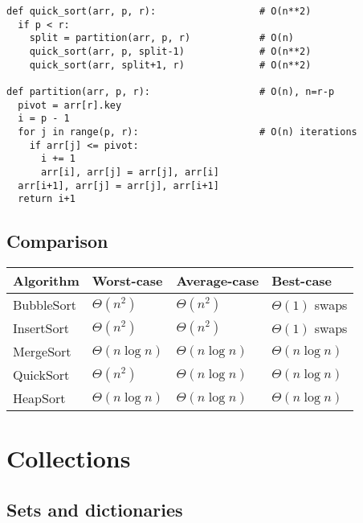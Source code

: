 \documentclass{article}
\begin{document}
\begin{verbatim}
def quick_sort(arr, p, r):                  # O(n**2)
  if p < r:
    split = partition(arr, p, r)            # O(n)
    quick_sort(arr, p, split-1)             # O(n**2)
    quick_sort(arr, split+1, r)             # O(n**2)

def partition(arr, p, r):                   # O(n), n=r-p
  pivot = arr[r].key
  i = p - 1
  for j in range(p, r):                     # O(n) iterations
    if arr[j] <= pivot:
      i += 1
      arr[i], arr[j] = arr[j], arr[i]
  arr[i+1], arr[j] = arr[j], arr[i+1]
  return i+1
\end{verbatim}

\subsection{Comparison}

\begin{center}
	\begin{tabular}{l | l | l | l}
		\textbf{Algorithm} & \textbf{Worst-case} & \textbf{Average-case} & \textbf{Best-case}
		\\\hline
		BubbleSort & $\Theta(n^2)$     & $\Theta(n^2)$     & $\Theta(1)$ swaps
		\\\hline
		InsertSort & $\Theta(n^2)$     & $\Theta(n^2)$     & $\Theta(1)$ swaps
		\\\hline
		MergeSort  & $\Theta(n\log n)$ & $\Theta(n\log n)$ & $\Theta(n\log n)$
		\\\hline
		QuickSort  & $\Theta(n^2)$     & $\Theta(n\log n)$ & $\Theta(n\log n)$
		\\\hline
		HeapSort   & $\Theta(n\log n)$ & $\Theta(n\log n)$ & $\Theta(n\log n)$
	\end{tabular}
\end{center}

\section{Collections}



\subsection{Sets and dictionaries}
\end{document}
